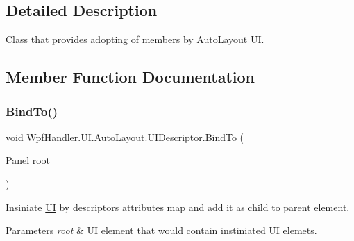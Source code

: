 \subsection{Detailed Description}
Class that provides adopting of members by \mbox{\hyperlink{namespace_wpf_handler_1_1_u_i_1_1_auto_layout}{Auto\+Layout}} \mbox{\hyperlink{namespace_wpf_handler_1_1_u_i}{UI}}. 



\subsection{Member Function Documentation}
\mbox{\label{class_wpf_handler_1_1_u_i_1_1_auto_layout_1_1_u_i_descriptor_af342f6e3f3a3fc86eed3e998bbce1cc5}} 
\subsubsection{\texorpdfstring{Bind\+To()}{BindTo()}}
{\footnotesize\ttfamily void Wpf\+Handler.\+U\+I.\+Auto\+Layout.\+U\+I\+Descriptor.\+Bind\+To (\begin{DoxyParamCaption}\item[{Panel}]{root }\end{DoxyParamCaption})}



Insiniate \mbox{\hyperlink{namespace_wpf_handler_1_1_u_i}{UI}} by descriptor\textquotesingle{}s attributes map and add it as child to parent element. 


\begin{DoxyParams}{Parameters}
{\em root} & \mbox{\hyperlink{namespace_wpf_handler_1_1_u_i}{UI}} element that would contain instiniated \mbox{\hyperlink{namespace_wpf_handler_1_1_u_i}{UI}} elemets.\\
\hline
\end{DoxyParams}
\mbox{\label{class_wpf_handler_1_1_u_i_1_1_auto_layout_1_1_u_i_descriptor_a2862ba93b12a9698b88795d41c672f97}} 
